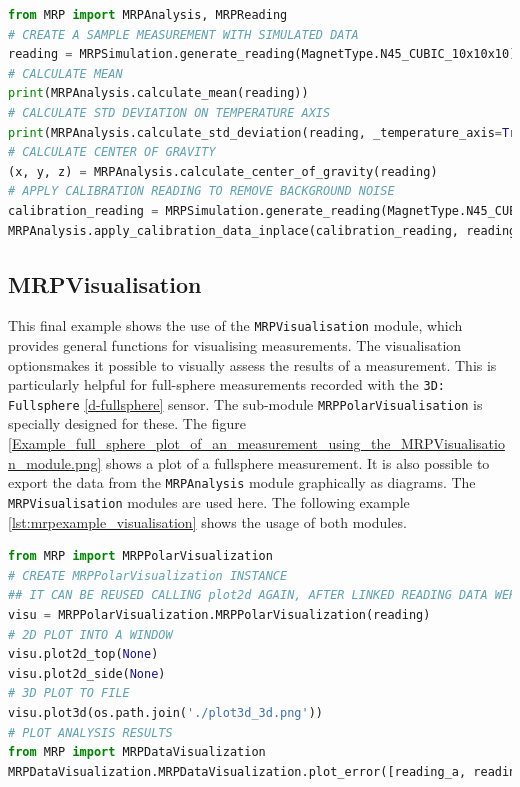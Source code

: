 \begin{lstlisting}[language=Python, caption={MRPAnalysis example code performs several data analysis steps}, label=lst:mrpexample_analysis]
from MRP import MRPAnalysis, MRPReading
# CREATE A SAMPLE MEASUREMENT WITH SIMULATED DATA
reading = MRPSimulation.generate_reading(MagnetType.N45_CUBIC_10x10x10)
# CALCULATE MEAN
print(MRPAnalysis.calculate_mean(reading))
# CALCULATE STD DEVIATION ON TEMPERATURE AXIS
print(MRPAnalysis.calculate_std_deviation(reading, _temperature_axis=True))
# CALCULATE CENTER OF GRAVITY
(x, y, z) = MRPAnalysis.calculate_center_of_gravity(reading)
# APPLY CALIBRATION READING TO REMOVE BACKGROUND NOISE
calibration_reading = MRPSimulation.generate_reading(MagnetType.N45_CUBIC_10x10x10, _ideal = True)
MRPAnalysis.apply_calibration_data_inplace(calibration_reading, reading)
\end{lstlisting}

\hypertarget{mrpvisualisation}{%
\subsection{MRPVisualisation}\label{mrpvisualisation}}

This final example shows the use of the
\passthrough{\lstinline!MRPVisualisation!} module, which provides
general functions for visualising measurements. The visualisation
optionsmakes it possible to visually assess the results of a
measurement. This is particularly helpful for full-sphere measurements
recorded with the \passthrough{\lstinline!3D: Fullsphere!}
\ref{d-fullsphere} sensor. The sub-module
\passthrough{\lstinline!MRPPolarVisualisation!} is specially designed
for these. The figure
\ref{Example_full_sphere_plot_of_an_measurement_using_the_MRPVisualisation_module.png}
shows a plot of a fullsphere measurement. It is also possible to export
the data from the \passthrough{\lstinline!MRPAnalysis!} module
graphically as diagrams. The \passthrough{\lstinline!MRPVisualisation!}
modules are used here. The following example
\ref{lst:mrpexample_visualisation} shows the usage of both modules.

\begin{lstlisting}[language=Python, caption={MRPVisualisation example which plots a fullsphere to an image file}, label=lst:mrpexample_visualisation]
from MRP import MRPPolarVisualization
# CREATE MRPPolarVisualization INSTANCE
## IT CAN BE REUSED CALLING plot2d AGAIN, AFTER LINKED READING DATA WERE MODIFIED
visu = MRPPolarVisualization.MRPPolarVisualization(reading)
# 2D PLOT INTO A WINDOW
visu.plot2d_top(None)
visu.plot2d_side(None)
# 3D PLOT TO FILE
visu.plot3d(os.path.join('./plot3d_3d.png'))
# PLOT ANALYSIS RESULTS
from MRP import MRPDataVisualization
MRPDataVisualization.MRPDataVisualization.plot_error([reading_a, reading_b, reading_c])
\end{lstlisting}

